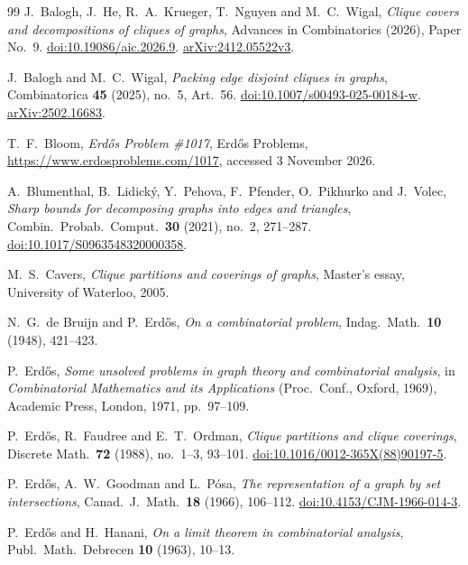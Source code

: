 \documentclass[10pt]{article}
\theoremstyle{definition}
\theoremstyle{remark}
\numberwithin{equation}{section}
\begin{document}
\begin{thebibliography}{99}
J.~Balogh, J.~He, R.~A.~Krueger, T.~Nguyen and M.~C.~Wigal, \emph{Clique covers and decompositions of cliques of graphs}, Advances in Combinatorics (2026), Paper No.~9. \href{https://doi.org/10.19086/aic.2026.9}{doi:10.19086/aic.2026.9}. \href{https://arxiv.org/abs/2412.05522v3}{arXiv:2412.05522v3}.

J.~Balogh and M.~C.~Wigal, \emph{Packing edge disjoint cliques in graphs}, Combinatorica \textbf{45} (2025), no.~5, Art.~56. \href{https://doi.org/10.1007/s00493-025-00184-w}{doi:10.1007/s00493-025-00184-w}. \href{https://arxiv.org/abs/2502.16683}{arXiv:2502.16683}.

T.~F.~Bloom, \emph{Erd\H{o}s Problem \#1017}, Erd\H{o}s Problems, \url{https://www.erdosproblems.com/1017}, accessed 3 November 2026.

A.~Blumenthal, B.~Lidick\'y, Y.~Pehova, F.~Pfender, O.~Pikhurko and J.~Volec, \emph{Sharp bounds for decomposing graphs into edges and triangles}, Combin.\ Probab.\ Comput.\ \textbf{30} (2021), no.~2, 271--287. \href{https://doi.org/10.1017/S0963548320000358}{doi:10.1017/S0963548320000358}.

M.~S.~Cavers, \emph{Clique partitions and coverings of graphs}, Master's essay, University of Waterloo, 2005.

N.~G.~de Bruijn and P.~Erd\H{o}s, \emph{On a combinatorial problem}, Indag.\ Math.\ \textbf{10} (1948), 421--423.

P.~Erd\H{o}s, \emph{Some unsolved problems in graph theory and combinatorial analysis}, in \emph{Combinatorial Mathematics and its Applications} (Proc.\ Conf., Oxford, 1969), Academic Press, London, 1971, pp.~97--109.

P.~Erd\H{o}s, R.~Faudree and E.~T.~Ordman, \emph{Clique partitions and clique coverings}, Discrete Math.\ \textbf{72} (1988), no.~1--3, 93--101. \href{https://doi.org/10.1016/0012-365X(88)90197-5}{doi:10.1016/0012-365X(88)90197-5}.

P.~Erd\H{o}s, A.~W.~Goodman and L.~P\'osa, \emph{The representation of a graph by set intersections}, Canad.\ J.\ Math.\ \textbf{18} (1966), 106--112. \href{https://doi.org/10.4153/CJM-1966-014-3}{doi:10.4153/CJM-1966-014-3}.

P.~Erd\H{o}s and H.~Hanani, \emph{On a limit theorem in combinatorial analysis}, Publ.\ Math.\ Debrecen \textbf{10} (1963), 10--13.


\end{thebibliography}
\end{document}
